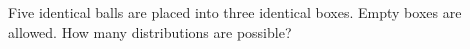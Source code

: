 Five identical balls are placed into three identical boxes. Empty boxes are allowed. How many distributions are possible?
